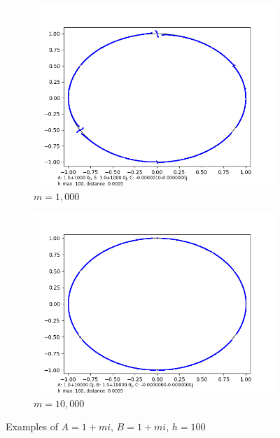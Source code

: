 \documentclass[12pt,a4paper,reqno,parskip=full]{amsart}
\numberwithin{equation}{section}
\theoremstyle{plain}
\theoremstyle{definition}
\begin{document}
\begin{figure}
\begin{subfigure}[b]{0.3\textwidth}
         \centering
         \includegraphics[width=\textwidth]{images/m/a1000,b1000,h100,d.0005.png}
         \caption{$m=1,000$}
         \label{fig:m1,000}
     \end{subfigure}
     \hfill
     \begin{subfigure}[b]{0.3\textwidth}
         \centering
         \includegraphics[width=\textwidth]{images/m/a10,000,b10,000,h100,d.0005.png}
         \caption{$m=10,000$}
         \label{fig:m10,000}
     \end{subfigure}
     
        \caption{Examples of $A=1+mi$, $B=1+mi$, $h=100$}
        \label{fig:m}
\end{figure}
\end{document}
